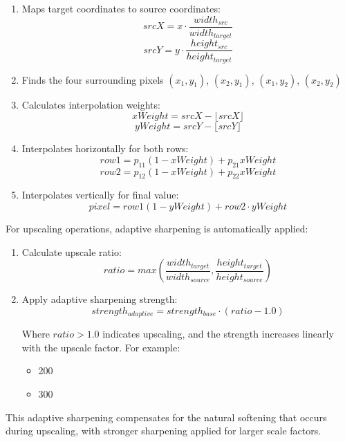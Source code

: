 \documentclass[12pt,a4paper]{report}
\begin{document}
\begin{enumerate}
    \item Maps target coordinates to source coordinates:
    \[ srcX = x \cdot \frac{width_{src}}{width_{target}} \]
    \[ srcY = y \cdot \frac{height_{src}}{height_{target}} \]
    
    \item Finds the four surrounding pixels $(x_1, y_1)$, $(x_2, y_1)$, $(x_1, y_2)$, $(x_2, y_2)$
    \item Calculates interpolation weights:
    \[ xWeight = srcX - \lfloor srcX \rfloor \]
    \[ yWeight = srcY - \lfloor srcY \rfloor \]
    
    \item Interpolates horizontally for both rows:
    \[ row1 = p_{11}(1-xWeight) + p_{21}xWeight \]
    \[ row2 = p_{12}(1-xWeight) + p_{22}xWeight \]
    
    \item Interpolates vertically for final value:
    \[ pixel = row1(1-yWeight) + row2 \cdot yWeight \]
\end{enumerate}

For upscaling operations, adaptive sharpening is automatically applied:
\begin{enumerate}
    \item Calculate upscale ratio:
    \[ ratio = max(\frac{width_{target}}{width_{source}}, \frac{height_{target}}{height_{source}}) \]
    
    \item Apply adaptive sharpening strength:
    \[ strength_{adaptive} = strength_{base} \cdot (ratio - 1.0) \]
    
    Where $ratio > 1.0$ indicates upscaling, and the strength increases linearly with the upscale factor.
    For example:
    \begin{itemize}
        \item 200%
        \item 300%
    \end{itemize}
\end{enumerate}

This adaptive sharpening compensates for the natural softening that occurs during upscaling, with stronger sharpening applied for larger scale factors.
\end{document}

